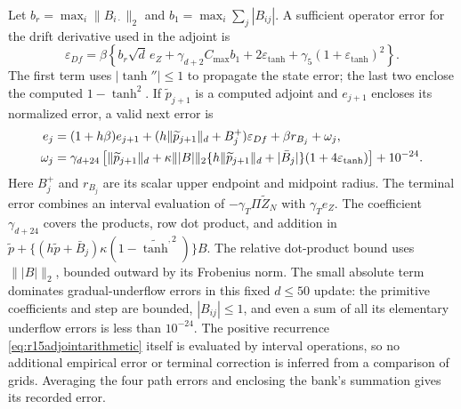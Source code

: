 Let $b_r=\max_i\|B_{i\cdot}\|_2$ and
$b_1=\max_i\sum_j|B_{ij}|$. A sufficient operator error for the
drift derivative used in the adjoint is
\begin{equation}
 \varepsilon_{Df}=\beta\left\{
 b_r\sqrt d\,e_Z+\gamma_{d+2}C_{\max}b_1
       +2\varepsilon_{\tanh}
       +\gamma_5(1+\varepsilon_{\tanh})^2\right\}.
 \label{eq:r15dfarithmetic}
\end{equation}
The first term uses $|\tanh''|\leq1$ to propagate the state error;
the last two enclose the computed $1-\tanh^2$.
If $\widetilde p_{j+1}$ is a computed adjoint and $e_{j+1}$ encloses
its normalized error, a valid next error is
\begin{align}
 e_j={}&(1+h\beta)e_{j+1}
       +(h\|\widetilde p_{j+1}\|_d+B_j^+)
                                      \varepsilon_{Df}
       +\beta r_{B_j}+\omega_j,\label{eq:r15adjointarithmetic}\\
 \omega_j={}&\gamma_{d+24}\left[
       \|\widetilde p_{j+1}\|_d+
       \kappa\||B|\|_2
       \{h\|\widetilde p_{j+1}\|_d+|\bar B_j|\}
                    (1+4\varepsilon_{\tanh})\right]+10^{-24}.
       \notag
\end{align}
Here $B_j^+$ and $r_{B_j}$ are its scalar upper endpoint and midpoint
radius. The terminal error combines an interval evaluation of
$-\gamma_T\Pi\widetilde Z_N$ with $\gamma_Te_Z$.
The coefficient $\gamma_{d+24}$ covers the products, row dot product,
and addition in
$\widetilde p+\{(h\widetilde p+\bar B_j)
\kappa(1-\widetilde{\tanh}^{,2})\}B$.
The relative dot-product bound uses $\||B|\|_2$, bounded outward by
its Frobenius norm. The small absolute term dominates gradual-underflow
errors in this fixed $d\leq50$ update: the primitive coefficients and
step are bounded, $|B_{ij}|\leq1$, and even a sum of all its elementary
underflow errors is less than $10^{-24}$. The positive recurrence
\eqref{eq:r15adjointarithmetic} itself is evaluated by interval
operations, so no additional empirical error or terminal correction is
inferred from a comparison of grids. Averaging the four path errors
and enclosing the bank's summation gives its recorded error.

